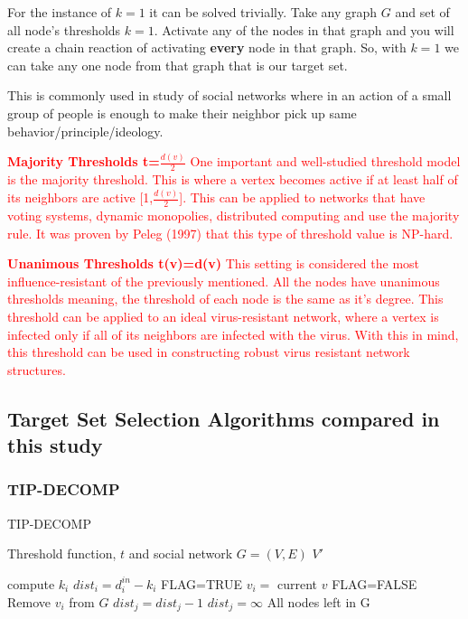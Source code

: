 \begin{enumerate}
For the instance of $k=1$ it can be solved trivially. Take any graph $G$ and set of all node's thresholds $k=1$. Activate any of the nodes in that graph and you will create a chain reaction of activating \textbf{every} node in that graph. So, with $k=1$ we can take any one node from that graph that is our target set.\cite{chen}

This is commonly used in study of social networks where in an action of a small group of people is enough to make their neighbor pick up same behavior/principle/ideology.
	\textcolor{red}{
	\item \textbf{Majority Thresholds t=$\frac{d(v)}{2}$} One important and well-studied threshold model is the majority threshold. This is where a vertex becomes active if at least half of its neighbors are active [1,$\frac{d(v)}{2}$].\cite{chen} This can be applied to networks that have voting systems, dynamic monopolies, distributed computing and use the majority rule. It was proven by Peleg (1997) that this type of threshold value is NP-hard. \cite{majority} }
	
	\textcolor{red}{
	\item \textbf{Unanimous Thresholds t(v)=d(v)} This setting is considered the most influence-resistant of the previously mentioned.\cite{chen} All the nodes have unanimous thresholds meaning, the threshold of each node is the same as it's degree. This threshold can be applied to an ideal virus-resistant network, where a vertex is infected only if all of its neighbors are infected with the virus. With this in mind, this threshold can be used in constructing robust virus resistant network structures.\cite{chen} }
\end{enumerate}

\subsection{Target Set Selection Algorithms compared in this study}

\subsubsection{TIP-DECOMP}
\begin{algorithm}
	\caption{TIP-DECOMP}
	\begin{algorithmic}[1]
		\Require Threshold function, $t$ and social network $G=(V,E)$
		\Ensure $V'$
		
			\State compute $k_{i}$ 
		\EndFor
			\State $dist_{i}=d_{i}^{in}-k_{i} $
		\EndFor
		\State FLAG=TRUE 
					\State $v_{i}=$ current $v$
				\EndIf
			\EndFor
				\State FLAG=FALSE 
			\Else
			\State Remove $v_{i}$ from $G$ 
						\State $dist_{j}=dist_{j}-1$
					\Else
						\State$dist_{j}=\infty$  
					\EndIf
				\EndFor
			\EndIf
		\EndWhile
		\State \Return All nodes left in G 
	\end{algorithmic}
\end{algorithm}


